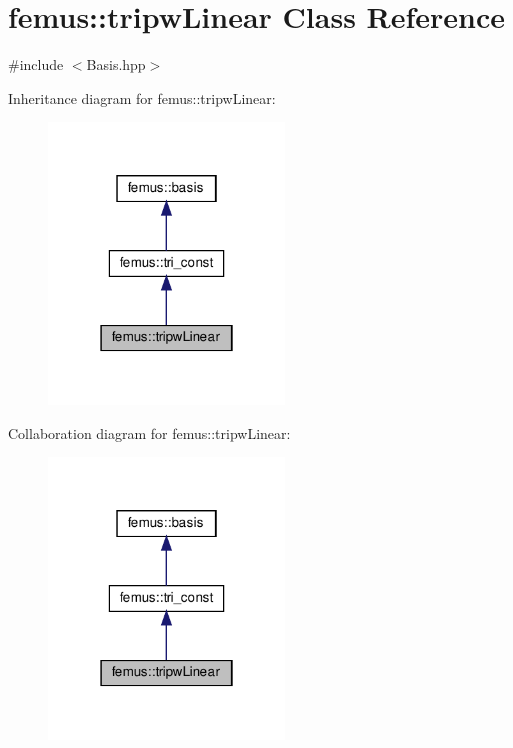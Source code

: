\hypertarget{classfemus_1_1tripw_linear}{}\section{femus\+:\+:tripw\+Linear Class Reference}
\label{classfemus_1_1tripw_linear}


{\ttfamily \#include $<$Basis.\+hpp$>$}



Inheritance diagram for femus\+:\+:tripw\+Linear\+:
\nopagebreak
\begin{figure}[H]
\begin{center}
\leavevmode
\includegraphics[width=178pt]{classfemus_1_1tripw_linear__inherit__graph}
\end{center}
\end{figure}


Collaboration diagram for femus\+:\+:tripw\+Linear\+:
\nopagebreak
\begin{figure}[H]
\begin{center}
\leavevmode
\includegraphics[width=178pt]{classfemus_1_1tripw_linear__coll__graph}
\end{center}
\end{figure}
